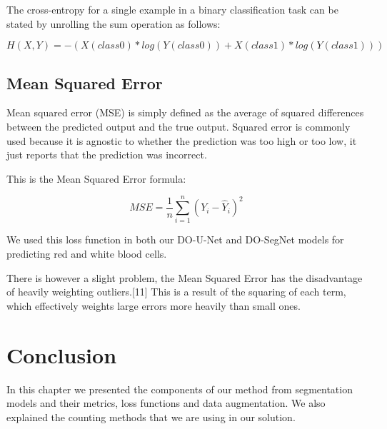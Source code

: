 The cross-entropy for a single example in a binary classification task can be stated by unrolling the sum operation as follows:

\begin{equation}
    H(X, Y) = - (X(class0) * log(Y(class0)) + X(class1) * log(Y(class1)))
\end{equation}

\subsection{Mean Squared Error}
\hspace{\parindent}
Mean squared error (MSE) is simply defined as the average of squared differences between the predicted output and the true output. Squared error is commonly used because it is agnostic to whether the prediction was too high or too low, it just reports that the prediction was incorrect.

This is the Mean Squared Error formula:

\begin{equation}
    MSE = \frac{1}{n} \sum_{i=1}^{n} (Y_{i} - \hat{Y}_{i})^{2}
\end{equation}

We used this loss function in both our DO-U-Net and DO-SegNet models for predicting red and white blood cells.\

There is however a slight problem, the Mean Squared Error has the disadvantage of heavily weighting outliers.[11] This is a result of the squaring of each term, which effectively weights large errors more heavily than small ones.

\section{Conclusion}
\vspace{0.2in}
\hspace{\parindent}
In this chapter we presented the components of our method from segmentation models and their metrics, loss functions and data augmentation. We also explained the counting methods that we are using in our solution.

\newpage
